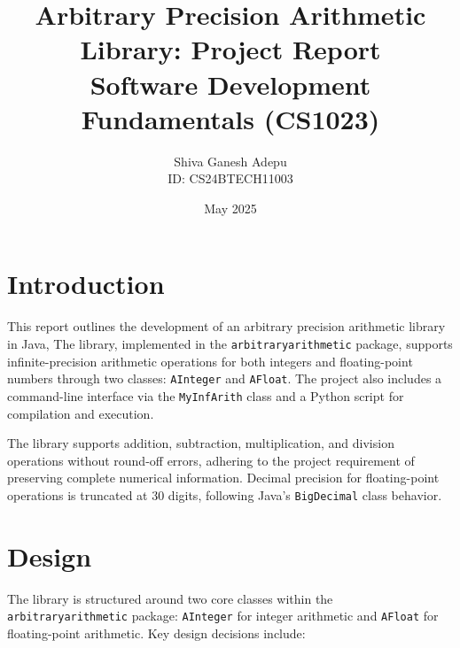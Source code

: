 \documentclass[a4paper,12pt]{article}
\begin{document}
\title{Arbitrary Precision Arithmetic Library: Project Report \\ Software Development Fundamentals (CS1023)}
\author{Shiva Ganesh Adepu \\ ID: CS24BTECH11003}
\date{May 2025}
\maketitle

\tableofcontents
\newpage

\section{Introduction}
This report outlines the development of an arbitrary precision arithmetic library in Java, The library, implemented in the \texttt{arbitraryarithmetic} package, supports infinite-precision arithmetic operations for both integers and floating-point numbers through two classes: \texttt{AInteger} and \texttt{AFloat}. The project also includes a command-line interface via the \texttt{MyInfArith} class and a Python script for compilation and execution.

The library supports addition, subtraction, multiplication, and division operations without round-off errors, adhering to the project requirement of preserving complete numerical information. Decimal precision for floating-point operations is truncated at 30 digits, following Java's \texttt{BigDecimal} class behavior.

\section{Design}
The library is structured around two core classes within the \texttt{arbitraryarithmetic} package: \texttt{AInteger} for integer arithmetic and \texttt{AFloat} for floating-point arithmetic. Key design decisions include:
\end{document}

